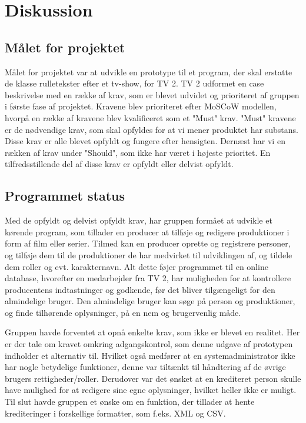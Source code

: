 \newpage
\section{Diskussion}

\subsection{Målet for projektet}%
\label{sub:malet_for_projektet}

Målet for projektet var at udvikle en prototype til et program, der skal
erstatte de klasse rulletekster efter et tv-show, for TV 2. TV 2 udformet en
case beskrivelse med en række af krav, som er blevet udvidet og prioriteret af
gruppen i første fase af projektet. Kravene blev prioriteret efter MoSCoW
modellen, hvorpå en række af kravene blev kvalificeret som et "Must" krav.
"Must" kravene er de nødvendige krav, som skal opfyldes for at vi mener
produktet har substans. Disse krav er alle blevet opfyldt og fungere efter
hensigten. Dernæst har vi en rækken af krav under "Should", som ikke har været i
højeste prioritet. En tilfredsstillende del af disse krav er opfyldt eller
delvist opfyldt.

\subsection{Programmet status}%
\label{sub:programmet}

Med de opfyldt og delvist opfyldt krav, har gruppen formået at udvikle et
kørende program, som tillader en producer at tilføje og redigere produktioner i
form af film eller serier. Tilmed kan en producer oprette og registrere
personer, og tilføje dem til de produktioner de har medvirket til udviklingen
af, og tildele dem roller og evt. karakternavn. Alt dette føjer programmet til
en online database, hvorefter en medarbejder fra TV 2, har muligheden for at
kontrollere producentens indtastninger og godkende, før det bliver tilgængeligt
for den almindelige bruger. Den almindelige bruger kan søge på person og
produktioner, og finde tilhørende oplysninger, på en nem og brugervenlig måde. 

Gruppen havde forventet at opnå enkelte krav, som ikke er blevet en realitet.
Her er der tale om kravet omkring adgangskontrol, som denne udgave af prototypen
indholder et alternativ til. Hvilket også medfører at en systemadministrator
ikke har nogle betydelige funktioner, denne var tiltænkt til håndtering af de
øvrige brugers rettigheder/roller. Derudover var det ønsket at en krediteret
person skulle have mulighed for at redigere sine egne oplysninger, hvilket
heller ikke er muligt. Til slut havde gruppen et ønske om en funktion, der
tillader at hente krediteringer i forskellige formatter, som f.eks. XML og CSV. 

